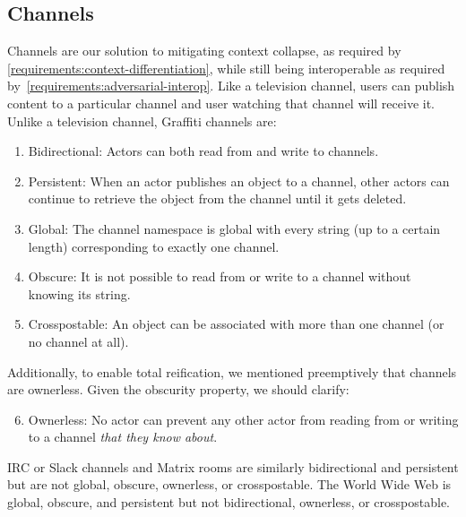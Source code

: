

\subsection{Channels}
\label{concepts:channels}

Channels are our solution to mitigating context collapse, as required by
\ref{requirements:context-differentiation}, while still being
interoperable as required by~\ref{requirements:adversarial-interop}.
Like a television channel, users can publish content to a particular channel
and user watching that channel will receive it.
Unlike a television channel, Graffiti channels are:

\begin{enumerate}
\item
Bidirectional: Actors can both read from and write to channels.
\item
Persistent: When an actor publishes an object to a channel, other actors can
continue to retrieve the object from the channel until it gets deleted.
\item
Global: The channel namespace is global with every string (up to a certain length)
corresponding to exactly one channel.
\item
Obscure: It is not possible to read from or write to a channel without knowing
its string.
\item
Crosspostable: An object can be associated with more than one channel (or no channel at all).
\end{enumerate}

Additionally, to enable total reification, we mentioned preemptively that channels are ownerless.
Given the obscurity property, we should clarify:

\begin{enumerate}
\setcounter{enumi}{5}
\item
Ownerless: No actor can prevent any other actor from reading from or writing to a channel
\emph{that they know about}.
\end{enumerate}

IRC or Slack channels and Matrix rooms are similarly bidirectional and persistent
but are not global, obscure, ownerless, or crosspostable.
The World Wide Web is global, obscure, and persistent
but not bidirectional, ownerless, or crosspostable.

